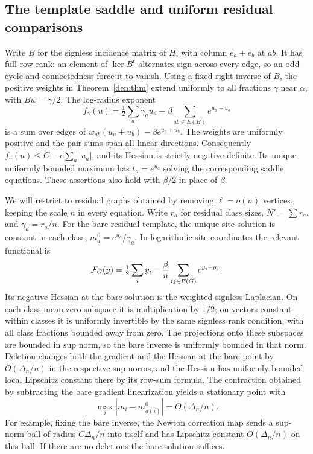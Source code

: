 \subsection{The template saddle and uniform residual comparisons}

Write \(B\) for the signless incidence matrix of \(H\), with column \(e_a+e_b\) at \(ab\). It has full row rank: an element of \(\ker B^t\) alternates sign across every edge, so an odd cycle and connectedness force it to vanish. Using a fixed right inverse of \(B\), the positive weights in Theorem~\ref{den:thm} extend uniformly to all fractions \(\gamma\) near \(\alpha\), with \(Bw=\gamma/2\). The log-radius exponent
\[
 f_\gamma(u)=\tfrac12\sum_a\gamma_a u_a-\beta\sum_{ab\in E(H)}e^{u_a+u_b}
\]
is a sum over edges of \(w_{ab}(u_a+u_b)-\beta e^{u_a+u_b}\). The weights are uniformly positive and the pair sums span all linear directions. Consequently \(f_\gamma(u)\le C-c\sum_a|u_a|\), and its Hessian is strictly negative definite. Its unique uniformly bounded maximum has \(t_a=e^{u_a}\) solving the corresponding saddle equations. These assertions also hold with \(\beta/2\) in place of \(\beta\).

We will restrict to residual graphs obtained by removing \(\ell=o(n)\) vertices, keeping the scale \(n\) in every equation. Write \(r_a\) for residual class sizes, \(N'=\sum r_a\), and \(\gamma_a=r_a/n\). For the bare residual template, the unique site solution is constant in each class, \(m_a^0=e^{u_a}/\gamma_a\). In logarithmic site coordinates the relevant functional is
\[
 {\cal F}_G(y)=\tfrac12\sum_i y_i-\frac{\beta}{n}
                  \sum_{ij\in E(G)}e^{y_i+y_j}.
\]
Its negative Hessian at the bare solution is the weighted signless Laplacian. On each class-mean-zero subspace it is multiplication by \(1/2\); on vectors constant within classes it is uniformly invertible by the same signless rank condition, with all class fractions bounded away from zero. The projections onto these subspaces are bounded in sup norm, so the bare inverse is uniformly bounded in that norm. Deletion changes both the gradient and the Hessian at the bare point by \(O(\Delta_n/n)\) in the respective sup norms, and the Hessian has uniformly bounded local Lipschitz constant there by its row-sum formula. The contraction obtained by subtracting the bare gradient linearization yields a stationary point with
\begin{equation}\label{den:vertexclose}
 \max_i|m_i-m_{a(i)}^0|=O(\Delta_n/n).
\end{equation}
For example, fixing the bare inverse, the Newton correction map sends a sup-norm ball of radius \(C\Delta_n/n\) into itself and has Lipschitz constant \(O(\Delta_n/n)\) on this ball. If there are no deletions the bare solution suffices.

